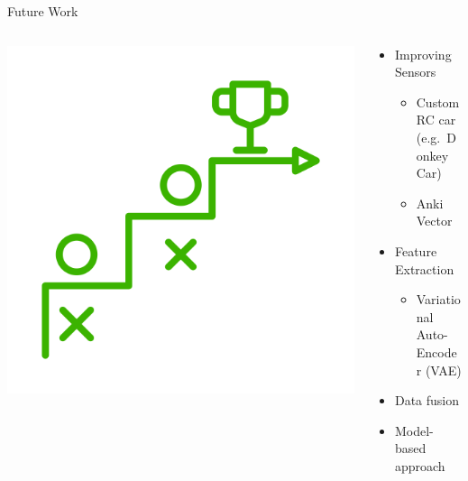 \documentclass[aspectratio=169]{beamer}
\begin{document}
\begin{frame}{Future Work}
	\begin{columns}
		\begin{column}{0.4\linewidth}
			\centering
			\includegraphics[width=0.6\linewidth]{img/future.png}
		\end{column}
		\begin{column}{0.6\linewidth}
			\begin{itemize}[<+- | alert@+>]
				\item Improving Sensors
				\begin{itemize}
					\item Custom RC car (e.g.\ Donkey Car)
					\item Anki Vector
				\end{itemize}
				\item Feature Extraction
				\begin{itemize}
					\item Variational Auto-Encoder (VAE)
				\end{itemize}
				\item Data fusion
				\item Model-based approach
			\end{itemize}
		\end{column}
	\end{columns}
\end{frame}
\end{document}
